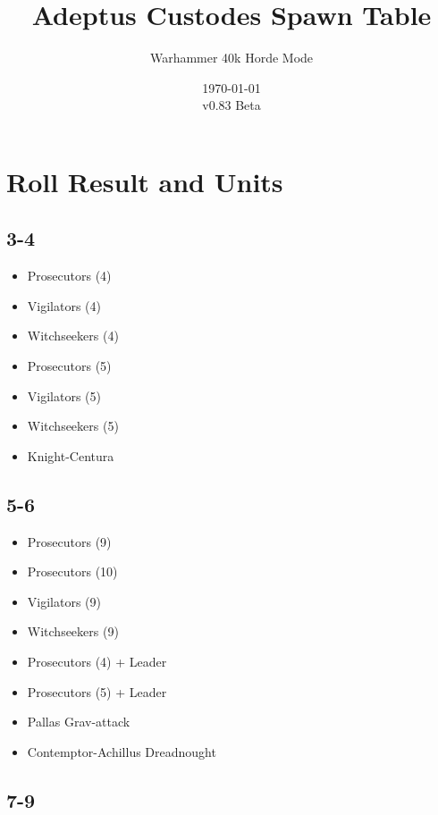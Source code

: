 \documentclass{HordeModeTarot}
\title{Adeptus Custodes Spawn Table}
\author{Warhammer 40k Horde Mode}
\date{\today \\v0.83 Beta}
\begin{document}
\maketitle

\outputUsingSpawnTableBoilerplate
\section{Roll Result and Units}\hypertarget{roll-results}{}\label{roll-results}

\begin{multicols}{2}

\subsection*{3-4}

\begin{itemize}[leftmargin=*]
\item[] Prosecutors (4)
\item[] Vigilators (4)
\item[] Witchseekers (4)
\item[] Prosecutors (5)
\item[] Vigilators (5)
\item[] Witchseekers (5)
\item[] Knight-Centura
\end{itemize}

\subsection*{5-6}

\begin{itemize}[leftmargin=*]
\item[] Prosecutors (9)
\item[] Prosecutors (10)
\item[] Vigilators (9)
\item[] Witchseekers (9)
\item[] Prosecutors (4) + Leader
\item[] Prosecutors (5) + Leader
\item[] Pallas Grav-attack
\item[] Contemptor-Achillus Dreadnought
\end{itemize}

\subsection*{7-9}


\end{multicols}
\end{document}
